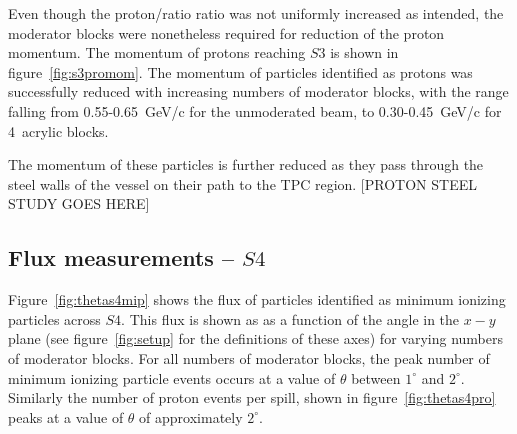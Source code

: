   Even though the proton/ratio ratio was not uniformly increased as intended, the moderator blocks were nonetheless required for reduction of the proton momentum.
  The momentum of protons reaching $\mathit{S3}$ is shown in figure~\ref{fig:s3promom}. 
  The momentum of particles identified as protons was successfully reduced with increasing numbers of moderator blocks, with the range falling from 0.55-0.65~GeV/c for the unmoderated beam, to 0.30-0.45~GeV/c for 4~acrylic blocks.
  
  The momentum of these particles is further reduced as they pass through the steel walls of the vessel on their path to the TPC region.
  [PROTON STEEL STUDY GOES HERE]


  \subsection{Flux measurements -- $\mathit{S4}$}

    
    Figure~\ref{fig:thetas4mip} shows the flux of particles identified as minimum ionizing particles across $\mathit{S4}$.
    This flux is shown as as a function of the angle in the $x-y$ plane (see figure~\ref{fig:setup} for the definitions of these axes) for varying numbers of moderator blocks.
    For all numbers of moderator blocks, the peak number of minimum ionizing particle events occurs at a value of $\theta$ between $1^{\circ}$ and $2^{\circ}$.
    Similarly the number of proton events per spill, shown in figure~\ref{fig:thetas4pro} peaks at a value of $\theta$ of approximately $2^{\circ}$.
    
